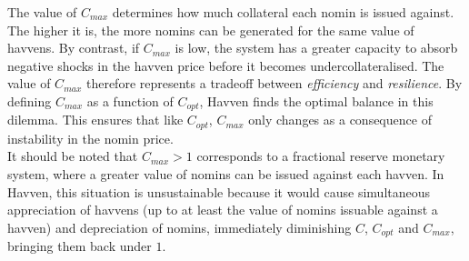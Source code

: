 \vspace{2mm}

\noindent The value of \(C_{max}\) determines how much collateral each nomin
is issued against. The higher it is, the more nomins can be generated for
the same value of havvens. By contrast, if \(C_{max}\) is low, the system
has a greater capacity to absorb negative shocks in the havven price before
it becomes undercollateralised. The value of \(C_{max}\) therefore represents a
tradeoff between \textit{efficiency} and \textit{resilience}. By defining
\(C_{max}\) as a function of \(C_{opt}\), Havven finds the optimal balance in
this dilemma. This ensures that like \(C_{opt}\), \(C_{max}\) only changes as a
consequence of instability in the nomin price. \\

\noindent It should be noted that \(C_{max} > 1\) corresponds to a fractional
reserve monetary system, where a greater value of nomins can be issued
against each havven. In Havven, this situation is unsustainable because it
would cause simultaneous appreciation of havvens (up to at least the value of
nomins issuable against a havven) and depreciation of nomins, immediately
diminishing \(C\), \(C_{opt}\) and \(C_{max}\), bringing them back under \(1\).
